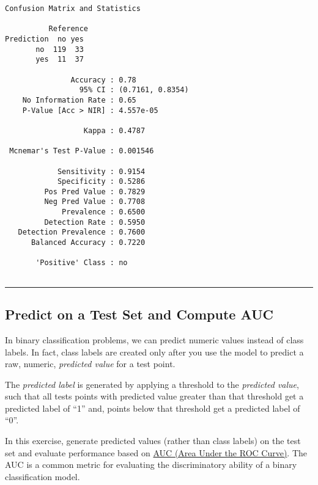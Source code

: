 \documentclass[
]{book}
\begin{document}
\begin{verbatim}
Confusion Matrix and Statistics

          Reference
Prediction  no yes
       no  119  33
       yes  11  37
                                          
               Accuracy : 0.78            
                 95% CI : (0.7161, 0.8354)
    No Information Rate : 0.65            
    P-Value [Acc > NIR] : 4.557e-05       
                                          
                  Kappa : 0.4787          
                                          
 Mcnemar's Test P-Value : 0.001546        
                                          
            Sensitivity : 0.9154          
            Specificity : 0.5286          
         Pos Pred Value : 0.7829          
         Neg Pred Value : 0.7708          
             Prevalence : 0.6500          
         Detection Rate : 0.5950          
   Detection Prevalence : 0.7600          
      Balanced Accuracy : 0.7220          
                                          
       'Positive' Class : no              
                                          
\end{verbatim}

\begin{center}\rule{0.5\linewidth}{0.5pt}\end{center}

\hypertarget{predict-on-a-test-set-and-compute-auc}{%
\subsection{Predict on a Test Set and Compute AUC}\label{predict-on-a-test-set-and-compute-auc}}

In binary classification problems, we can predict numeric values instead of class labels. In fact, class labels are created only after you use the model to predict a raw, numeric, \emph{predicted value} for a test point.

The \emph{predicted label} is generated by applying a threshold to the \emph{predicted value}, such that all tests points with predicted value greater than that threshold get a predicted label of ``1'' and, points below that threshold get a predicted label of ``0''.

In this exercise, generate predicted values (rather than class labels) on the test set and evaluate performance based on \href{https://en.wikipedia.org/wiki/Receiver_operating_characteristic\#Area_under_the_curve}{AUC (Area Under the ROC Curve)}. The AUC is a common metric for evaluating the discriminatory ability of a binary classification model.
\end{document}
